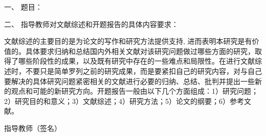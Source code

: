 
\newpage

\thispagestyle{empty}

{
\setlength{\parindent}{0em}
\renewcommand{\baselinestretch}{2}
{\songti\sihao\bfseries

一、 \; 题目： \; \underline{\makebox[24em]{\zjutitlec}}

\vspace{2em}

二、 \; 指导教师对文献综述和开题报告的具体内容要求： \\ \par
}
{
  \songti\xiaosi 


文献综述的主要目的是为论文的写作和研究方法提供支持, 进而表明本研究是有价值的。具体要求归纳和总结国内外相关文献对该研究问题做过哪些方面的研究，取得了哪些阶段性的成果，以及既有研究中存在的一些难点和局限性。在进行文献综述时，不要只是简单罗列之前的研究成果，而是要紧扣自己的研究内容，对与自己要解决的具体研究问题紧密相关的文献进行必要的归纳、总结、批判并提出一些新的观点和可能的新研究方向。开题报告一般由以下几个方面组成：1）研究问题；2）研究目的和意义；3）文献综述；4）研究方法；5）论文的纲要；6）参考文献。
}

\vspace{9cm}

}
{
\songti\xiaosi\bfseries
\begin{flushright}
  指导教师（签名） \; \underline{\hspace{6em}} \\
\end{flushright}
}


